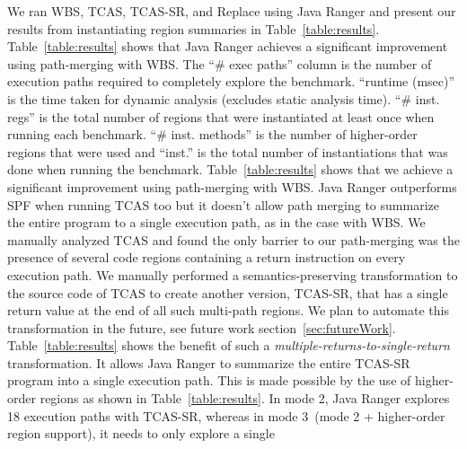 %

We ran WBS, TCAS, TCAS-SR, and Replace using Java Ranger and present our results from instantiating region summaries
in Table~\ref{table:results}.
%
Table~\ref{table:results} shows that Java Ranger achieves a significant improvement using path-merging with WBS.
%
The ``\# exec paths'' column is the number of execution paths required to completely explore the benchmark.
%
``runtime (msec)'' is the time taken for dynamic analysis (excludes static analysis time).
%
``\# inst. regs'' is the total number of regions that were instantiated at least once when running each benchmark.
%
``\# inst. methods'' is the number of higher-order regions that were used and ``inst.'' is the total number of
instantiations that was done when running the benchmark.
%
Table~\ref{table:results} shows that we achieve a significant improvement using path-merging with WBS.
%
Java Ranger outperforms SPF when running TCAS too but it doesn't allow path merging to summarize the entire program
to a single execution path, as in the case with WBS.
%
We manually analyzed TCAS and found the only barrier to our path-merging was the presence of several code
regions containing a return instruction on every execution path.
%
We manually performed a semantics-preserving transformation to the source code of TCAS to create another version, TCAS-SR,
that has a single return value at the end of all such multi-path regions.
%
We plan to automate this transformation in the future, see future work section~\ref{sec:futureWork}.
%
Table~\ref{table:results} shows the benefit of such a \textit{multiple-returns-to-single-return} transformation.
%
It allows Java Ranger to summarize the entire TCAS-SR program into a single execution path.
%
This is made possible by the use of higher-order regions as shown in Table~\ref{table:results}.
%
In mode 2, Java Ranger explores 18 execution paths with TCAS-SR, whereas in mode 3~(mode 2 + higher-order region support), it needs to only explore a single
